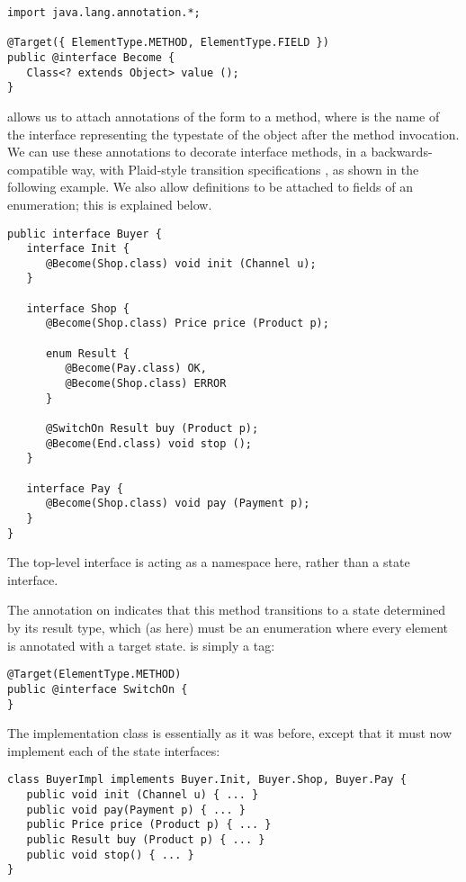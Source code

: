 \begin{lstlisting}
import java.lang.annotation.*;

@Target({ ElementType.METHOD, ElementType.FIELD })
public @interface Become {
   Class<? extends Object> value ();
}
\end{lstlisting}

\noindent {} allows us to attach annotations of the form
 to a method, where  is the name
of the interface representing the typestate of the object after the
method invocation. We can use these annotations to decorate interface
methods, in a backwards-compatible way, with Plaid-style transition
specifications \cite{garcia14}, as shown in the following example. We
also allow  definitions to be attached to fields of an
enumeration; this is explained below.

\begin{lstlisting}
public interface Buyer {
   interface Init {
      @Become(Shop.class) void init (Channel u);
   }

   interface Shop {
      @Become(Shop.class) Price price (Product p);

      enum Result {
         @Become(Pay.class) OK,
         @Become(Shop.class) ERROR
      }

      @SwitchOn Result buy (Product p);
      @Become(End.class) void stop ();
   }

   interface Pay {
      @Become(Shop.class) void pay (Payment p);
   }
}
\end{lstlisting}

\noindent The top-level  interface is acting as a
namespace here, rather than a state interface.

The  annotation on  indicates that this method
transitions to a state determined by its result type, which (as here)
must be an enumeration where every element is annotated with a target
state.  is simply a tag:
\begin{lstlisting}
@Target(ElementType.METHOD)
public @interface SwitchOn {
}
\end{lstlisting}

The implementation class  is essentially as it was
before, except that it must now implement each of the state
interfaces:

\begin{lstlisting}
class BuyerImpl implements Buyer.Init, Buyer.Shop, Buyer.Pay {
   public void init (Channel u) { ... }
   public void pay(Payment p) { ... }
   public Price price (Product p) { ... }
   public Result buy (Product p) { ... }
   public void stop() { ... }
}
\end{lstlisting}

